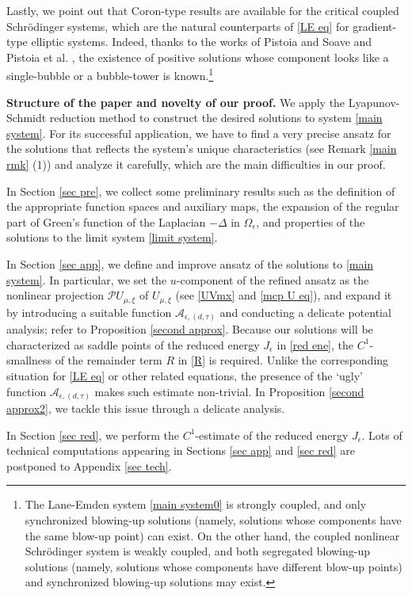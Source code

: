 \documentclass[reqno]{amsart}
\theoremstyle{remark}
\newcommand{\ep}{\epsilon}
\newcommand{\mca}{\mathcal{A}}
\newcommand{\mcp}{\mathcal{P}}
\newcommand{\mx}{{\mu,\xi}}
\renewcommand{\(}{\left(}
\renewcommand{\)}{\right)}
\numberwithin{equation}{section}
\begin{document}
Lastly, we point out that Coron-type results are available for the critical coupled Schr\"odinger systems, which are the natural counterparts of \eqref{LE eq} for gradient-type elliptic systems.
Indeed, thanks to the works of Pistoia and Soave \cite{PS} and Pistoia et al. \cite{PST}, the existence of positive solutions whose component looks like a single-bubble or a bubble-tower is known.\footnote{The Lane-Emden system
\eqref{main system0} is strongly coupled, and only synchronized blowing-up solutions (namely, solutions whose components have the same blow-up point) can exist.
On the other hand, the coupled nonlinear Schr\"odinger system is weakly coupled, and both segregated blowing-up solutions (namely, solutions whose components have different blow-up points) and synchronized blowing-up solutions may exist.}

\medskip \noindent \textbf{Structure of the paper and novelty of our proof.}
We apply the Lyapunov-Schmidt reduction method to construct the desired solutions to system \eqref{main system}.
For its successful application, we have to find a very precise ansatz for the solutions that reflects the system's unique characteristics (see Remark \ref{main rmk} (1)) and analyze it carefully, which are the main difficulties in our proof.

In Section \ref{sec pre}, we collect some preliminary results such as the definition of the appropriate function spaces and auxiliary maps,
the expansion of the regular part of Green's function of the Laplacian $-\Delta$ in $\Omega_\ep$, and properties of the solutions to the limit system \eqref{limit system}.

In Section \ref{sec app}, we define and improve ansatz of the solutions to \eqref{main system}.
In particular, we set the $u$-component of the refined ansatz as the nonlinear projection $\mcp U_\mx$ of $U_\mx$ (see \eqref{UVmx} and \eqref{mcp U eq}),
and expand it by introducing a suitable function $\mca_{\ep,(d,\tau)}$ and conducting a delicate potential analysis; refer to Proposition \ref{second approx}.
Because our solutions will be characterized as saddle points of the reduced energy $J_\ep$ in \eqref{red ene}, the $C^1$-smallness of the remainder term $R$ in \eqref{R} is required.
Unlike the corresponding situation for \eqref{LE eq} or other related equations, the presence of the `ugly' function $\mca_{\ep,(d,\tau)}$ makes such estimate non-trivial.
In Proposition \ref{second approx2}, we tackle this issue through a delicate analysis.

In Section \ref{sec red}, we perform the $C^1$-estimate of the reduced energy $J_\ep$.
Lots of technical computations appearing in Sections \ref{sec app} and \ref{sec red} are postponed to Appendix \ref{sec tech}.
\end{document}
